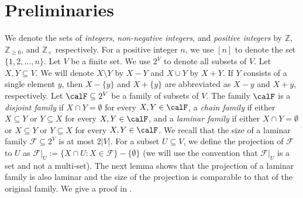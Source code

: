 \section{Preliminaries}\label{sec:prelims}


We denote the sets of 
\emph{integers}, \emph{non-negative integers}, and \emph{positive integers} by 
$\mathbb{Z}$, $\mathbb{Z}_{\geq 0}$, and $\mathbb{Z}_+$ respectively. For a positive integer $n$, we use $[n]$ to denote the set $\{1, 2, \ldots, n\}$. %
Let $V$ be a finite set. We use $2^{V}$ to denote all subsets of $V$. 
Let $X, Y\subseteq V$. We will denote $X\setminus Y$ by $X-Y$ and $X\cup Y$ by $X+Y$. If $Y$ consists of a single element $y$, then $X-\{y\}$ and $X+\{y\}$ are abbreviated as $X-y$ and $X+y$, respectively. 
Let $\calF\subseteq 2^V$ be a family of subsets of $V$. 
The family $\calF$ is 
a \emph{disjoint family} if $X\cap Y=\emptyset$ for every $X, Y\in \calF$, 
a \emph{chain family} if either $X\subseteq Y$ or $Y\subseteq X$ for every $X, Y\in \calF$, and a \emph{laminar family} if either $X\cap Y=\emptyset$ or $X\subseteq Y$ or $Y\subseteq X$ for every $X, Y\in \calF$. 
We recall that the size of a laminar family $\mathcal{F}\subseteq 2^V$ is at most $2|V|$. 
For a subset $U\subseteq V$, we define the projection of $\mathcal{F}$ to $U$ as   $\mathcal{F}|_U:=\{X\cap U: X\in \mathcal{F}\}-\{\emptyset\}$ (we will use the convention that $\mathcal{F}|_U$ is a set and not a multi-set). 
The next lemma shows that the projection of a laminar family is also laminar and the size of the projection is comparable to that of the original family. We give a proof in .  %

